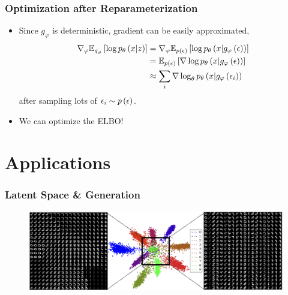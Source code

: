 \documentclass[10pt,mathserif]{beamer}
\begin{document}
\begin{frame}
  \frametitle{Optimization after Reparameterization}
  \begin{itemize}
  \item Since $g_{\varphi}$ is deterministic, gradient can be easily
    approximated,
  \begin{align*}
    \nabla_{\varphi} \mathbb{E}_{q_{\varphi}}\left[{\log p_{\theta}\left(x \vert z\right)}\right] &=
    \nabla_{\varphi} \mathbb{E}_{p\left(\epsilon\right)}\left[{\log p_{\theta}\left(x \vert g_{\varphi}\left(\epsilon\right)\right)}\right] \\
    &= \mathbb{E}_{p\left(\epsilon\right)}\left[{\nabla \log p_{\theta}\left(x \vert g_{\varphi}\left(\epsilon\right)\right)}\right] \\
      &\approx \sum_{i} \nabla \log_{\theta}p_{\theta}\left(x \vert g_{\varphi}\left(\epsilon_{i}\right)\right)
  \end{align*}
  after sampling lots of $\epsilon_{i} \sim p\left(\epsilon\right)$.
  \item We can optimize the ELBO!
  \end{itemize}
\end{frame}

\section{Applications}
\label{sec:applications}

\begin{frame}
  \frametitle{Latent Space \& Generation}
\begin{figure}[ht]
  \centering
  \includegraphics[width=0.6\paperwidth]{figure/vae_latent}
  \caption{\label{fig:vae_latent} }
\end{figure}
\end{frame}
\end{document}
